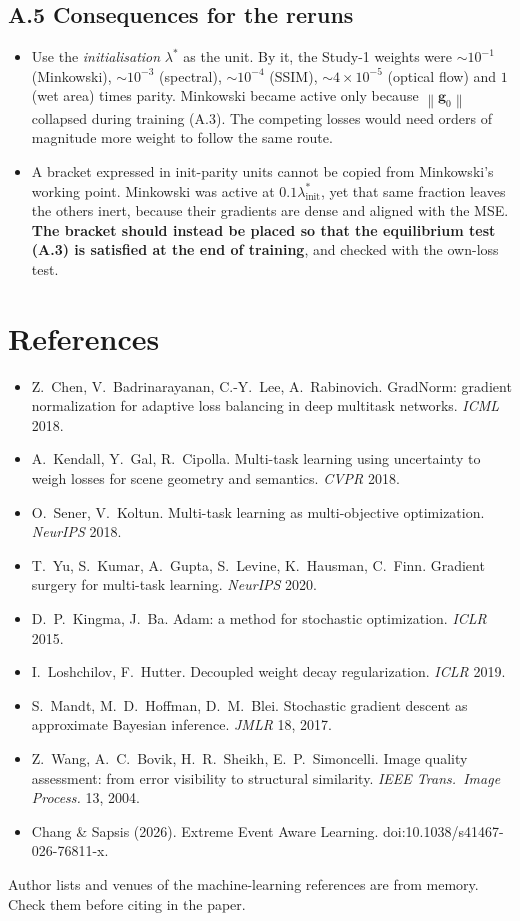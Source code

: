 \documentclass[11pt,a4paper]{article}
\theoremstyle{definition}
\theoremstyle{remark}
\newcommand{\norm}[1]{\left\lVert #1 \right\rVert}
\newcommand{\g}{\bm{g}}
\begin{document}
\subsection*{A.5 Consequences for the reruns}
\begin{itemize}[nosep]
\item Use the \emph{initialisation} $\lambda^*$ as the unit. By it, the Study-1 weights were
  $\sim10^{-1}$ (Minkowski), $\sim10^{-3}$ (spectral), $\sim10^{-4}$ (SSIM),
  $\sim4\times10^{-5}$ (optical flow) and $1$ (wet area) times parity. Minkowski became
  active only because $\norm{\g_0}$ collapsed during training (A.3). The competing losses
  would need orders of magnitude more weight to follow the same route.
\item A bracket expressed in init-parity units cannot be copied from Minkowski's working
  point. Minkowski was active at $0.1\lambda^*_{\text{init}}$, yet that same fraction leaves
  the others inert, because their gradients are dense and aligned with the MSE.
  \textbf{The bracket should instead be placed so that the equilibrium test (A.3) is
  satisfied at the end of training}, and checked with the own-loss test.
\end{itemize}

\section*{References}
\begin{itemize}[leftmargin=*,nosep]
\item Z.~Chen, V.~Badrinarayanan, C.-Y.~Lee, A.~Rabinovich. GradNorm: gradient
  normalization for adaptive loss balancing in deep multitask networks. \emph{ICML} 2018.
\item A.~Kendall, Y.~Gal, R.~Cipolla. Multi-task learning using uncertainty to weigh losses
  for scene geometry and semantics. \emph{CVPR} 2018.
\item O.~Sener, V.~Koltun. Multi-task learning as multi-objective optimization.
  \emph{NeurIPS} 2018.
\item T.~Yu, S.~Kumar, A.~Gupta, S.~Levine, K.~Hausman, C.~Finn. Gradient surgery for
  multi-task learning. \emph{NeurIPS} 2020.
\item D.~P.~Kingma, J.~Ba. Adam: a method for stochastic optimization. \emph{ICLR} 2015.
\item I.~Loshchilov, F.~Hutter. Decoupled weight decay regularization. \emph{ICLR} 2019.
\item S.~Mandt, M.~D.~Hoffman, D.~M.~Blei. Stochastic gradient descent as approximate
  Bayesian inference. \emph{JMLR} 18, 2017.
\item Z.~Wang, A.~C.~Bovik, H.~R.~Sheikh, E.~P.~Simoncelli. Image quality assessment: from
  error visibility to structural similarity. \emph{IEEE Trans.\ Image Process.} 13, 2004.
\item Chang \& Sapsis (2026). Extreme Event Aware Learning. doi:10.1038/s41467-026-76811-x.
\end{itemize}
\medskip
\noindent\small Author lists and venues of the machine-learning references are from memory.
Check them before citing in the paper.
\end{document}
